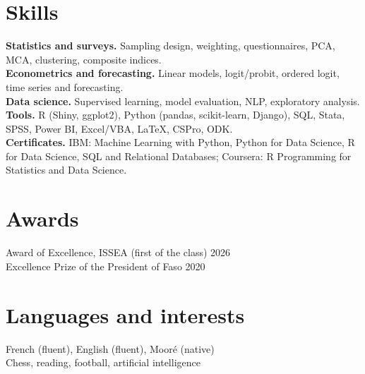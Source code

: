 \documentclass[10pt,a4paper]{article}
\begin{document}
\section{Skills}
\textbf{Statistics and surveys.} Sampling design, weighting, questionnaires, PCA, MCA, clustering, composite indices.\\
\textbf{Econometrics and forecasting.} Linear models, logit/probit, ordered logit, time series and forecasting.\\
\textbf{Data science.} Supervised learning, model evaluation, NLP, exploratory analysis.\\
\textbf{Tools.} R (Shiny, ggplot2), Python (pandas, scikit-learn, Django), SQL, Stata, SPSS, Power BI, Excel/VBA, \LaTeX, CSPro, ODK.\\
\textbf{Certificates.} IBM: Machine Learning with Python, Python for Data Science, R for Data Science, SQL and Relational Databases; Coursera: R Programming for Statistics and Data Science.

\vspace{2pt}
\begin{minipage}[t]{0.52\textwidth}
\section{Awards}
Award of Excellence, ISSEA (first of the class) \hfill {\small\color{muted}2026}\\
Excellence Prize of the President of Faso \hfill {\small\color{muted}2020}
\end{minipage}\hfill
\begin{minipage}[t]{0.42\textwidth}
\section{Languages and interests}
French (fluent), English (fluent), Moor\'e (native)\\
Chess, reading, football, artificial intelligence
\end{minipage}
\end{document}
